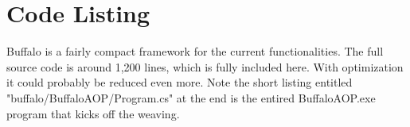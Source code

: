 \chapter{Code Listing}

Buffalo is a fairly compact framework for the current functionalities. The full source code is around 1,200 lines, which is fully included here. With optimization it could probably be reduced even more. Note the short listing entitled "buffalo/BuffaloAOP/Program.cs" at the end is the entired BuffaloAOP.exe program that kicks off the weaving.

\vspace{5mm}

